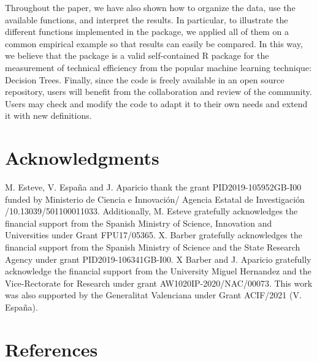 Throughout the paper, we have also shown how to organize the data, use the available functions, and interpret the results. In particular, to illustrate the different functions implemented in the package, we applied all of them on a common empirical example so that results can easily be compared. In this way, we believe that the  package is a valid self-contained R package for the measurement of technical efficiency from the popular machine learning technique: Decision Trees. Finally, since the code is freely available in an open source repository, users will benefit from the collaboration and review of the community. Users may check and modify the code to adapt it to their own needs and extend it with new definitions.

\hypertarget{acknowledgments}{%
\section{Acknowledgments}\label{acknowledgments}}

M. Esteve, V. España and J. Aparicio thank the grant PID2019-105952GB-I00 funded by Ministerio de Ciencia e Innovación/ Agencia Estatal de Investigación /10.13039/501100011033. Additionally, M. Esteve gratefully acknowledges the financial support from the Spanish Ministry of Science, Innovation and Universities under Grant FPU17/05365. X. Barber gratefully acknowledges the financial support from the Spanish Ministry of Science and the State Research Agency under grant PID2019-106341GB-I00. X Barber and J. Aparicio gratefully acknowledge the financial support from the University Miguel Hernandez and the Vice-Rectorate for Research under grant AW1020IP-2020/NAC/00073. This work was also supported by the Generalitat Valenciana under Grant ACIF/2021 (V. España).

\hypertarget{references}{%
\section*{References}\label{references}}


